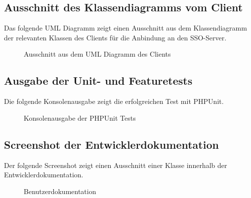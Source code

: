 \subsection{Ausschnitt des Klassendiagramms vom Client}
\label{app:socialite}
Das folgende UML Diagramm zeigt einen Ausschnitt aus dem Klassendiagramm der relevanten Klassen des Clients für die Anbindung an den \ac{SSO}-Server.
\begin{figure}[htb]
\centering
{}
\caption{Ausschnitt aus dem UML Diagramm des Clients}
\end{figure}
\clearpage

\subsection{Ausgabe der Unit- und Featuretests}
\label{app:tests_timy}
Die folgende Konsolenausgabe zeigt die erfolgreichen Test mit PHPUnit.
\begin{figure}[htb]
\centering
{}
\caption{Konsolenausgabe der PHPUnit Tests}
\end{figure}
\clearpage

\subsection{Screenshot der Entwicklerdokumentation}
\label{app:phpdoc}
Der folgende Screenshot zeigt einen Ausschnitt einer Klasse innerhalb der Entwicklerdokumentation.
\begin{figure}[htb]
\centering
{}
\caption{Benutzerdokumentation}
\end{figure}
\clearpage


